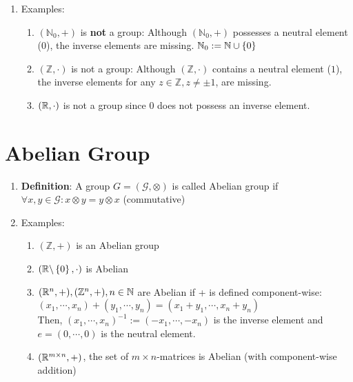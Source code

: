 \begin{enumerate}
    \item Examples:
    \begin{enumerate}
        \item $(\mathbb{N}_0, +)$ is \textbf{not} a group: Although $(\mathbb{N}_0, +)$ possesses a neutral element ($0$), the inverse elements are missing.
        \hfill $\mathbb{N}_0 := \mathbb{N} \cup \left\{0\right\}$
        \hfill \cite{mfml/book/mml/Deisenroth-Faisal-Ong}

        \item $(\mathbb{Z}, \cdot)$ is not a group: Although $(\mathbb{Z}, \cdot)$ contains a neutral element ($1$), the inverse elements for any $z \in \mathbb{Z}, z \neq \pm1$, are missing.
        \hfill \cite{mfml/book/mml/Deisenroth-Faisal-Ong}

        \item $(\mathbb{R}, \cdot)$ is not a group since $0$ does not possess an inverse element.
        \hfill \cite{mfml/book/mml/Deisenroth-Faisal-Ong}


    \end{enumerate}
\end{enumerate}






\section{Abelian Group}

\begin{enumerate}
    \item \textbf{Definition}: A group $G = (\mathcal{G}, \otimes)$ is called Abelian group if $\forall x, y \in \mathcal{G} : x \otimes y = y \otimes x$ (commutative)
    \hfill \cite{mfml/book/mml/Deisenroth-Faisal-Ong}

    \item Examples:
    \begin{enumerate}
        \item $(\mathbb{Z}, +)$ is an Abelian group
        \hfill \cite{mfml/book/mml/Deisenroth-Faisal-Ong}

        \item $( \mathbb{R} \backslash \left\{0\right\}, \cdot)$ is Abelian
        \hfill \cite{mfml/book/mml/Deisenroth-Faisal-Ong}

        \item $(\mathbb{R}^n, +),(\mathbb{Z}^n, +), n \in \mathbb{N}$ are Abelian if + is defined component-wise:
        \\
        $
            (x_1, \cdots , x_n) + (y_1, \cdots , y_n) = (x_1 + y_1, \cdots , x_n + y_n)
        $
        \\
        Then, $(x_1, \cdots , x_n)^{-1} := (-x_1, \cdots , -x_n)$ is the inverse element and $e = (0, \cdots , 0)$ is the neutral element.

        \item $(\mathbb{R}^{m\times n} , +)$, the set of $m \times n$-matrices is Abelian  (with component-wise addition)


    \end{enumerate}
\end{enumerate}





